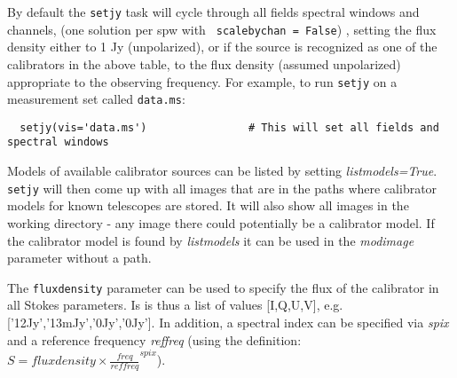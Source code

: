 %




By default the {\tt setjy} task will cycle through all
fields spectral windows and channels, (one solution per spw with {\tt
  scalebychan = False}) , setting the flux density either to 1 Jy
(unpolarized), or if the source is recognized as one of the
calibrators in the above table, to the flux density (assumed
unpolarized) appropriate to the observing frequency.  For example, to
run {\tt setjy} on a measurement set called {\tt data.ms}: \small
\begin{verbatim}
  setjy(vis='data.ms')                # This will set all fields and spectral windows
\end{verbatim}
\normalsize

Models of available calibrator sources can be listed by setting {\it
  listmodels=True}. {\tt setjy} will then come up with all images
that are in the paths where calibrator models for known telescopes are
stored. It will also show all images in the working directory - any
image there could potentially be a calibrator model. If the calibrator
model is found by {\it listmodels} it can be used in the {\it
  modimage} parameter without a path.

The {\tt fluxdensity} parameter can be used to specify the flux of the
calibrator in all Stokes parameters. Is is thus a list of values
[I,Q,U,V], e.g. ['12Jy','13mJy','0Jy','0Jy']. In addition, a spectral
index can be specified via {\it spix} and a reference frequency {\it
  reffreq} (using the definition: $S = fluxdensity\times\frac{
  freq}{reffreq}^{spix}$).


